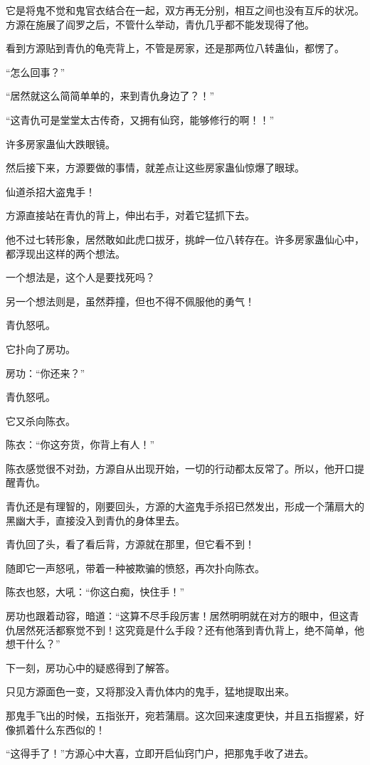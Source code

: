 \begin{this_body}
它是将鬼不觉和鬼官衣结合在一起，双方再无分别，相互之间也没有互斥的状况。方源在施展了阎罗之后，不管什么举动，青仇几乎都不能发现得了他。

看到方源贴到青仇的龟壳背上，不管是房家，还是那两位八转蛊仙，都愣了。

“怎么回事？”

“居然就这么简简单单的，来到青仇身边了？！”

“这青仇可是堂堂太古传奇，又拥有仙窍，能够修行的啊！！”

许多房家蛊仙大跌眼镜。

然后接下来，方源要做的事情，就差点让这些房家蛊仙惊爆了眼球。

仙道杀招大盗鬼手！

方源直接站在青仇的背上，伸出右手，对着它猛抓下去。

他不过七转形象，居然敢如此虎口拔牙，挑衅一位八转存在。许多房家蛊仙心中，都浮现出这样的两个想法。

一个想法是，这个人是要找死吗？

另一个想法则是，虽然莽撞，但也不得不佩服他的勇气！

青仇怒吼。

它扑向了房功。

房功：“你还来？”

青仇怒吼。

它又杀向陈衣。

陈衣：“你这夯货，你背上有人！”

陈衣感觉很不对劲，方源自从出现开始，一切的行动都太反常了。所以，他开口提醒青仇。

青仇还是有理智的，刚要回头，方源的大盗鬼手杀招已然发出，形成一个蒲扇大的黑幽大手，直接没入到青仇的身体里去。

青仇回了头，看了看后背，方源就在那里，但它看不到！

随即它一声怒吼，带着一种被欺骗的愤怒，再次扑向陈衣。

陈衣也怒，大吼：“你这白痴，快住手！”

房功也跟着动容，暗道：“这算不尽手段厉害！居然明明就在对方的眼中，但这青仇居然死活都察觉不到！这究竟是什么手段？还有他落到青仇背上，绝不简单，他想干什么？”

下一刻，房功心中的疑惑得到了解答。

只见方源面色一变，又将那没入青仇体内的鬼手，猛地提取出来。

那鬼手飞出的时候，五指张开，宛若蒲扇。这次回来速度更快，并且五指握紧，好像抓着什么东西似的！

“这得手了！”方源心中大喜，立即开启仙窍门户，把那鬼手收了进去。


\end{this_body}
